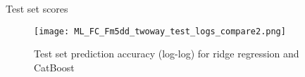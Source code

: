 \begin{table}
    \centering
    \begin{adjustbox}{max width=\textwidth}
    \begin{threeparttable}
        \caption{Test set scores}
        \label{tab:testscores}
        
    \end{threeparttable}
    \end{adjustbox}
\end{table}


\begin{figure}
    \centering
    \texttt{[image: ML\_FC\_Fm5dd\_twoway\_test\_logs\_compare2.png]}
    \caption{Test set prediction accuracy (log-log) for ridge regression and CatBoost}
    \label{fig:twoway_test_compare2}
\end{figure}





